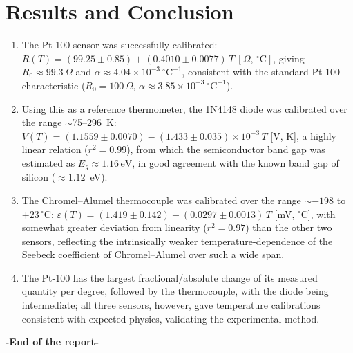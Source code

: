 \documentclass[11pt,a4paper]{article}
\begin{document}
\section{Results and Conclusion}
\begin{enumerate}[label=(\arabic*)]
    \item The Pt-100 sensor was successfully calibrated: $R(T) = (99.25\pm0.85) + (0.4010\pm0.0077)\,T\ [\Omega,\,^\circ\text{C}]$, giving $R_0 \approx 99.3\,\Omega$ and $\alpha \approx 4.04\times10^{-3}\ ^\circ\mathrm{C}^{-1}$, consistent with the standard Pt-100 characteristic ($R_0=100\,\Omega$, $\alpha \approx 3.85\times10^{-3}\ ^\circ\mathrm{C}^{-1}$).
    \item Using this as a reference thermometer, the 1N4148 diode was calibrated over the range $\sim$75--296~K: $V(T) = (1.1559\pm0.0070) - (1.433\pm0.035)\times10^{-3}\,T$ [V, K], a highly linear relation ($r^2=0.99$), from which the semiconductor band gap was estimated as $E_g \approx 1.16\,\mathrm{eV}$, in good agreement with the known band gap of silicon ($\approx1.12$~eV).
    \item The Chromel--Alumel thermocouple was calibrated over the range $\sim{-198}$ to $+23\,^\circ$C: $\varepsilon(T) = (1.419\pm0.142) - (0.0297\pm0.0013)\,T$ [mV, $^\circ$C], with somewhat greater deviation from linearity ($r^2=0.97$) than the other two sensors, reflecting the intrinsically weaker temperature-dependence of the Seebeck coefficient of Chromel--Alumel over such a wide span.
    \item The Pt-100 has the largest fractional/absolute change of its measured quantity per degree, followed by the thermocouple, with the diode being intermediate; all three sensors, however, gave temperature calibrations consistent with expected physics, validating the experimental method.
\end{enumerate}
\centering
{\large \textbf{-End of the report-}}\\[0.3cm]
\end{document}
